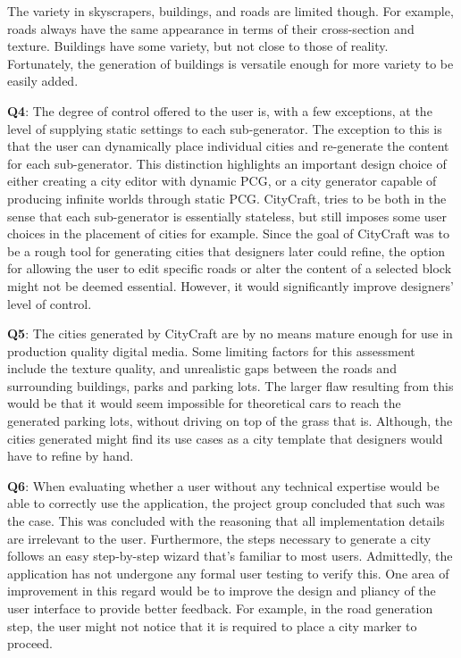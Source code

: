 The variety in skyscrapers, buildings, and roads are limited though.
For example, roads always have the same appearance in terms of their cross-section and texture.
Buildings have some variety, but not close to those of reality.
Fortunately, the generation of buildings is versatile enough for more variety to be easily added.

\textbf{Q4}:
The degree of control offered to the user is, with a few exceptions, at the level of supplying static settings to each sub-generator.
The exception to this is that the user can dynamically place individual cities and re-generate the content for each sub-generator.
This distinction highlights an important design choice of either creating a city editor with dynamic PCG, or a city generator capable of producing infinite worlds through static PCG.
CityCraft, tries to be both in the sense that each sub-generator is essentially stateless, but still imposes some user choices in the placement of cities for example.
Since the goal of CityCraft was to be a rough tool for generating cities that designers later could refine, the option for allowing the user to edit specific roads or alter the content of a selected block might not be deemed essential.
However, it would significantly improve designers' level of control.

\textbf{Q5}:
The cities generated by CityCraft are by no means mature enough for use in production quality digital media.
Some limiting factors for this assessment include the texture quality, and unrealistic gaps between the roads and surrounding buildings, parks and parking lots.
The larger flaw resulting from this would be that it would seem impossible for theoretical cars to reach the generated parking lots, without driving on top of the grass that is.
Although, the cities generated might find its use cases as a city template that designers would have to refine by hand.

\textbf{Q6}:
When evaluating whether a user without any technical expertise would be able to correctly use the application, the project group concluded that such was the case.
This was concluded with the reasoning that all implementation details are irrelevant to the user.
Furthermore, the steps necessary to generate a city follows an easy step-by-step wizard that's familiar to most users.
Admittedly, the application has not undergone any formal user testing to verify this.
One area of improvement in this regard would be to improve the design and pliancy of the user interface to provide better feedback.
For example, in the road generation step, the user might not notice that it is required to place a city marker to proceed.

